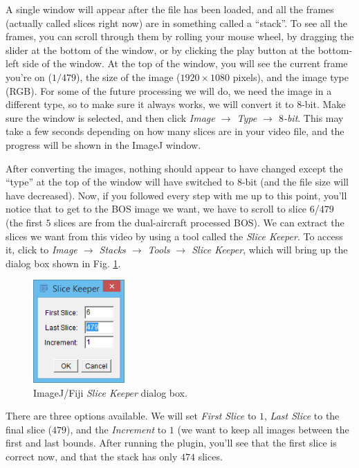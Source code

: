 \documentclass[letterpaper,12pt]{article}
\begin{document}
A single window will appear after the file has been loaded, and all the frames (actually called slices right now) are in something called a ``stack''.  To see all the frames, you can scroll through them by rolling your mouse wheel, by dragging the slider at the bottom of the window, or by clicking the play button at the bottom-left side of the window.  At the top of the window, you will see the current frame you're on ($1/479$), the size of the image ($1920\times1080$ pixels), and the image type (RGB).  For some of the future processing we will do, we need the image in a different type, so to make sure it always works, we will convert it to $8$-bit.  Make sure the window is selected, and then click \textcolor{myMagenta}{\textit{Image $\rightarrow$ Type $\rightarrow$ $8$-bit}}.  This may take a few seconds depending on how many slices are in your video file, and the progress will be shown in the ImageJ window.

After converting the images, nothing should appear to have changed except the ``type'' at the top of the window will have switched to $8$-bit (and the file size will have decreased).  Now, if you followed every step with me up to this point, you'll notice that to get to the BOS image we want, we have to scroll to slice $6$/$479$ (the first $5$ slices are from the dual-aircraft processed BOS).  We can extract the slices we want from this video by using a tool called the \textcolor{myMagenta}{\textit{Slice Keeper}}.  To access it, click to \textcolor{myMagenta}{\textit{Image $\rightarrow$ Stacks $\rightarrow$ Tools $\rightarrow$ Slice Keeper}}, which will bring up the dialog box shown in Fig. \ref{fig:ImageJ_Slice_Keeper_Options_1}.

\begin{figure}[h]
    \centering
    \includegraphics[width=3.5cm]{ImageJ_Slice_Keeper_Options_1.PNG}
    \caption{ImageJ/Fiji \textit{Slice Keeper} dialog box.}
    \label{fig:ImageJ_Slice_Keeper_Options_1}
\end{figure}

There are three options available. We will set \textcolor{myMagenta}{\textit{First Slice}} to $1$, \textcolor{myMagenta}{\textit{Last Slice}} to the final slice ($479$), and the \textcolor{myMagenta}{\textit{Increment}} to $1$ (we want to keep all images between the first and last bounds.  After running the plugin, you'll see that the first slice is correct now, and that the stack has only $474$ slices.
\end{document}
